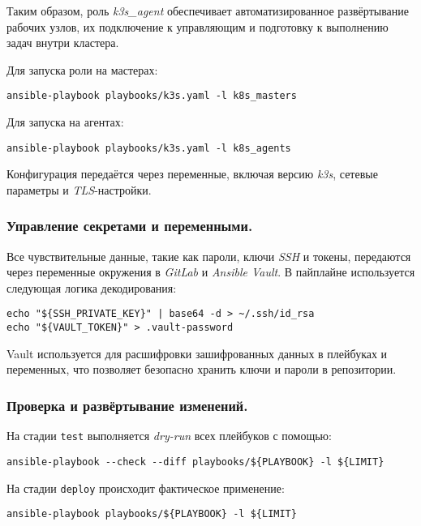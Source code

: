 Таким образом, роль \textit{k3s\_agent} обеспечивает автоматизированное развёртывание рабочих узлов, их подключение к управляющим и подготовку к выполнению задач внутри кластера.

Для запуска роли на мастерах:

\begin{lstlisting}
ansible-playbook playbooks/k3s.yaml -l k8s_masters
\end{lstlisting}

Для запуска на агентах:

\begin{lstlisting}
ansible-playbook playbooks/k3s.yaml -l k8s_agents
\end{lstlisting}

Конфигурация передаётся через переменные, включая версию \textit{k3s}, сетевые параметры и \textit{TLS}-настройки.

\subsubsection{Управление секретами и переменными.} Все чувствительные данные, такие как пароли, ключи \textit{SSH} и токены, передаются через переменные окружения в \textit{GitLab} и \textit{Ansible Vault}. В пайплайне используется следующая логика декодирования:

\begin{lstlisting}
echo "${SSH_PRIVATE_KEY}" | base64 -d > ~/.ssh/id_rsa
echo "${VAULT_TOKEN}" > .vault-password
\end{lstlisting}

Vault используется для расшифровки зашифрованных данных в плейбуках и переменных, что позволяет безопасно хранить ключи и пароли в репозитории.

\subsubsection{Проверка и развёртывание изменений.} На стадии \lstinline{test} выполняется \textit{dry-run} всех плейбуков с помощью:

\begin{lstlisting}
ansible-playbook --check --diff playbooks/${PLAYBOOK} -l ${LIMIT}
\end{lstlisting}

На стадии \lstinline{deploy} происходит фактическое применение:

\begin{lstlisting}
ansible-playbook playbooks/${PLAYBOOK} -l ${LIMIT}
\end{lstlisting}

